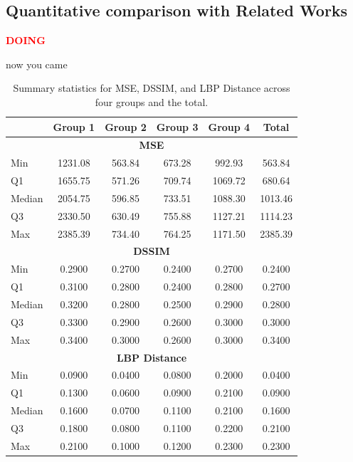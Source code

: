 \documentclass{ieeeaccess}
\begin{document}
\subsection{Quantitative comparison with Related Works}

\vspace{5mm} { \textcolor{red} {\textbf{DOING}}}  \vspace{5mm}

now you came


\begin{table}[h!]
\centering
\begin{tabular}{|l|c|c|c|c|c|}
\hline
& \textbf{Group 1} & \textbf{Group 2} & \textbf{Group 3} & \textbf{Group 4} & \textbf{Total} \\
\hline
\multicolumn{6}{|c|}{\textbf{MSE}} \\
\hline
Min     & 1231.08 & 563.84 & 673.28 & 992.93 & 563.84 \\
Q1      & 1655.75 & 571.26 & 709.74 & 1069.72 & 680.64 \\
Median  & 2054.75 & 596.85 & 733.51 & 1088.30 & 1013.46 \\
Q3      & 2330.50 & 630.49 & 755.88 & 1127.21 & 1114.23 \\
Max     & 2385.39 & 734.40 & 764.25 & 1171.50 & 2385.39 \\
\hline
\multicolumn{6}{|c|}{\textbf{DSSIM}} \\
\hline
\hline
Min     & 0.2900 & 0.2700 & 0.2400 & 0.2700 & 0.2400 \\
Q1      & 0.3100 & 0.2800 & 0.2400 & 0.2800 & 0.2700 \\
Median  & 0.3200 & 0.2800 & 0.2500 & 0.2900 & 0.2800 \\
Q3      & 0.3300 & 0.2900 & 0.2600 & 0.3000 & 0.3000 \\
Max     & 0.3400 & 0.3000 & 0.2600 & 0.3000 & 0.3400 \\
\hline
\multicolumn{6}{|c|}{\textbf{LBP Distance}} \\
\hline
\hline
Min     & 0.0900 & 0.0400 & 0.0800 & 0.2000 & 0.0400 \\
Q1      & 0.1300 & 0.0600 & 0.0900 & 0.2100 & 0.0900 \\
Median  & 0.1600 & 0.0700 & 0.1100 & 0.2100 & 0.1600 \\
Q3      & 0.1800 & 0.0800 & 0.1100 & 0.2200 & 0.2100 \\
Max     & 0.2100 & 0.1000 & 0.1200 & 0.2300 & 0.2300 \\
\hline
\end{tabular}
\caption{Summary statistics for MSE, DSSIM, and LBP Distance across four groups and the total.}
\label{tab:metrics_summary}
\end{table}
\end{document}
